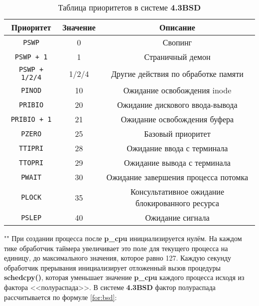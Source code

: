 \begin{table}[h]
    \caption{Таблица приоритетов в системе \textbf{4.3BSD}}
    \label{tab:bsd}
    \begin{center}
        \begin{tabular}{ |c|c|c|  }
            \hline
            \textbf{Приоритет} & \textbf{Значение} & \textbf{Описание} \\
            \hline
            \texttt{PSWP} & 0 & Свопинг \\
            \hline
            \texttt{PSWP + 1} & 1 & Страничный демон \\
            \hline
            \texttt{PSWP + 1/2/4} & 1/2/4 & Другие действия по обработке памяти \\
            \hline
            \texttt{PINOD} & 10 & Ожидание освобождения inode \\
            \hline
            \texttt{PRIBIO} & 20 & Ожидание дискового ввода-вывода \\
            \hline
            \texttt{PRIBIO + 1} & 21 & Ожидание освобождения буфера \\
            \hline
            \texttt{PZERO} & 25 & Базовый приоритет \\
            \hline
            \texttt{TTIPRI} & 28 & Ожидание ввода с терминала \\
            \hline
            \texttt{TTOPRI} & 29 & Ожидание вывода с терминала \\
            \hline 
            \texttt{PWAIT} & 30 & Ожидание завершения процесса потомка \\
            \hline
            \texttt{PLOCK} & 35 & Консультативное ожидание блокированного ресурса \\
            \hline
            \texttt{PSLEP} & 40 & Ожидание сигнала \\
            \hline
        \end{tabular}
    \end{center}
\end{table}

""\newline 
\noindent При создании процесса после \textbf{p\_cpu} инициализируется нулём. На каждом тике обработчик таймера увеличивает это поле для текущего процесса на единицу, до максимального значения, которое равно 127. Каждую секунду обработчик прерывания инициализирует отложенный вызов процедуры \textbf{schedcpy()}, которая уменьшает значение \textbf{p\_cpu} каждого процесса исходя из фактора <<полураспада>>. В системе \textbf{4.3BSD} фактор полураспада рассчитывается по формуле \eqref{for:bsd}: 

